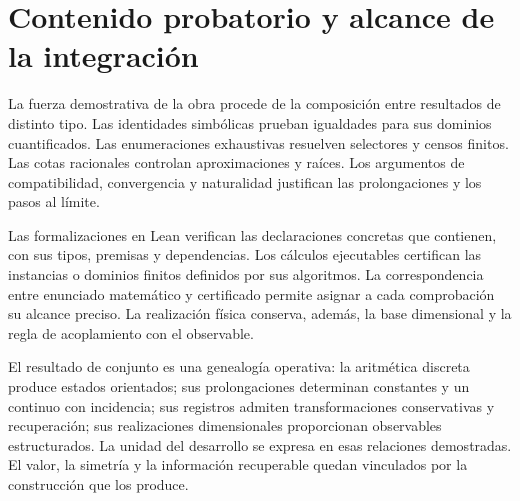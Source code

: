 \section{Contenido probatorio y alcance de la integración}

La fuerza demostrativa de la obra procede de
la composición entre resultados de distinto
tipo. Las identidades simbólicas prueban
igualdades para sus dominios cuantificados.
Las enumeraciones exhaustivas resuelven
selectores y censos finitos. Las cotas
racionales controlan aproximaciones y
raíces. Los argumentos de compatibilidad,
convergencia y naturalidad justifican las
prolongaciones y los pasos al límite.

Las formalizaciones en Lean verifican las
declaraciones concretas que contienen,
con sus tipos, premisas y dependencias.
Los cálculos ejecutables certifican las
instancias o dominios finitos definidos por
sus algoritmos. La correspondencia entre
enunciado matemático y certificado permite
asignar a cada comprobación su alcance
preciso. La realización física conserva,
además, la base dimensional y la regla de
acoplamiento con el observable.

El resultado de conjunto es una genealogía
operativa: la aritmética discreta produce
estados orientados; sus prolongaciones
determinan constantes y un continuo con
incidencia; sus registros admiten
transformaciones conservativas y
recuperación; sus realizaciones
dimensionales proporcionan observables
estructurados. La unidad del desarrollo
se expresa en esas relaciones demostradas.
El valor, la simetría y la información
recuperable quedan vinculados por la
construcción que los produce.
